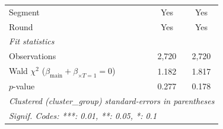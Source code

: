 \begin{tabular}{lcc}
   Segment                                                             & Yes           & Yes\\  
   Round                                                               & Yes           & Yes\\  
   \midrule
   \emph{Fit statistics}\\
   Observations                                                        & 2,720         & 2,720\\  
   Wald $\chi^2$ ($\beta_{\text{main}} + \beta_{\times T=1} = 0$)      & 1.182         & 1.817\\  
   \quad $p$-value                                                     & 0.277         & 0.178\\  
   \midrule \midrule
   \multicolumn{3}{l}{\emph{Clustered (cluster\_group) standard-errors in parentheses}}\\
   \multicolumn{3}{l}{\emph{Signif. Codes: ***: 0.01, **: 0.05, *: 0.1}}\\
\end{tabular}
\par\endgroup


